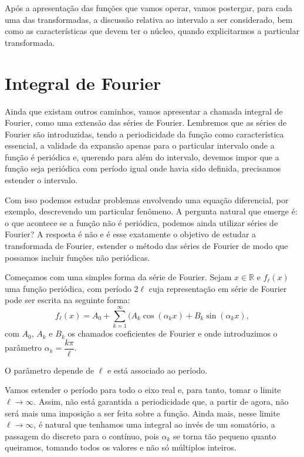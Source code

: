 Após a apresentação das funções que vamos operar, vamos postergar, para cada uma das transformadas, a discussão relativa ao intervalo a ser considerado, bem como as características que devem ter o núcleo, quando explicitarmos a particular transformada.

\section{Integral de Fourier}

  Ainda que existam outros caminhos, vamos apresentar a chamada integral de Fourier, como uma extensão das séries de Fourier. Lembremos que as séries de Fourier são introduzidas, tendo a periodicidade da função como característica essencial, a validade da expansão apenas para o particular intervalo onde a função é periódica e, querendo para além do intervalo, devemos impor que a função seja periódica com período igual onde havia sido definida, precisamos estender o intervalo.

  Com isso podemos estudar problemas envolvendo uma equação diferencial, por exemplo, descrevendo um particular fenômeno. A pergunta natural que emerge é: o que acontece se a função não é periódica, podemos ainda utilizar séries de Fourier? A resposta é não e é esse exatamente o objetivo de estudar a transformada de Fourier, estender o método das séries de Fourier de modo que possamos incluir funções não periódicas.

  Começamos com uma simples forma da série de Fourier. Sejam $x \in \mathbb{R}$ e $f_{\ell}(x)$ uma função periódica, com período $2\ell$ cuja representação em série de Fourier pode ser escrita na seguinte forma:
    $$f_{\ell}(x) = A_0 + \sum_{k=1}^{\infty} (A_k \cos(\alpha_k x) + B_k \sin(\alpha_k x),$$
    com $A_0$, $A_k$ e $B_k$ os chamados coeficientes de Fourier e onde introduzimos o parâmetro $\alpha_k = \dfrac{k\pi}{\ell}$.

    O parâmetro depende de $\ell$ e está associado ao período.

    Vamos estender o período para todo o eixo real e, para tanto, tomar o limite $\ell \to \infty$. Assim, não está garantida a periodicidade que, a partir de agora, não será mais uma imposição a ser feita sobre a função. Ainda mais, nesse limite $\ell \to \infty$, é natural que tenhamos uma integral ao invés de um somatório, a passagem do discreto para o contínuo, pois $\alpha_{k}$ se torna tão pequeno quanto queiramos, tomando todos os valores e não só múltiplos inteiros.

